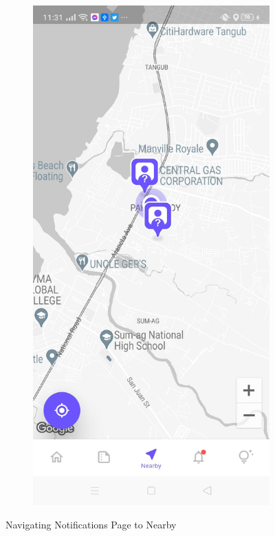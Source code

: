 \begin{figure}[!h]
\begin{subfigure}[c]{0.30\linewidth}
    \end{subfigure}
    \centering
    \begin{subfigure}[c]{0.30\linewidth}
        \centering
        \includegraphics[scale=0.15]{figures/Chapter4/Main/Nearby-1.jpg}
    \end{subfigure}
    \caption{Navigating Notifications Page to Nearby}
    \label{fig:notifications}
\end{figure}

